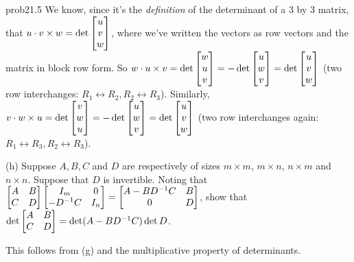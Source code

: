 \begin{sol}{prob21.5}
\soln We know, since it's the {\it definition} of the determinant of a 3 by 3 matrix, that $u\cdot v\times w =\det \bmatrix u\\v\\w\endbmatrix$, where we've written the vectors as row vectors and the matrix in block row form. So $w\cdot u\times v=\det \bmatrix w\\u\\v\endbmatrix =-\det \bmatrix u\\w\\v\endbmatrix=\det \bmatrix u\\v\\w\endbmatrix$ (two row interchanges: $R_1
\leftrightarrow R_2,R_2
\leftrightarrow R_3 $).  Similarly, $v\cdot w\times u=  \det \bmatrix v\\w\\u\endbmatrix =-\det \bmatrix u\\w\\v\endbmatrix=\det \bmatrix u\\v\\w\endbmatrix$ (two row interchanges again: $R_1
\leftrightarrow R_3,R_2
\leftrightarrow R_3 $).

\medskip

(h) Suppose $A, B, C$ and $D$ are respectively of sizes $m\times m$,   $m \times n$, $n \times m$ and $n \times n$. Suppose that $D$ is invertible. Noting that $ \bmatrix A&B\\C&D\endbmatrix \bmatrix I_m&0\\-D^{-1}C&I_n\endbmatrix  =\bmatrix A-BD^{-1}C&B\\0&D\endbmatrix$, show that $\det \bmatrix A&B\\C&D\endbmatrix= \det (A-BD^{-1}C) \det D$.

\soln This follows from (g) and the multiplicative property of determinants.
\medskip


\end{sol}

